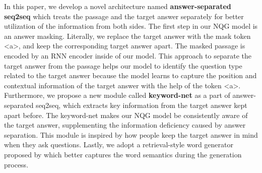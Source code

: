 \documentclass[letterpaper]{article} %
\newcommand{\kj}[1]{\textcolor{red}{#1}}
\begin{document}
In this paper, we develop a novel architecture named \textbf{answer-separated seq2seq} which treats the passage and the target answer separately for better utilization of the information from both sides. The first step in our NQG model is an answer masking. Literally, we replace the target answer with the mask token \textless a\textgreater{}, and keep the corresponding target answer apart. The masked passage is encoded by an RNN encoder inside of our model. This approach to separate the target answer from the passage helps our model to identify the question type related to the target answer because the model learns to capture the position and contextual information of the target answer with the help of the token \textless a\textgreater{}. Furthermore, we propose a new module called \textbf{keyword-net} as a part of answer-separated seq2seq, which extracts key information from the target answer kept apart before. The keyword-net makes our NQG model be consistently aware of the target answer, supplementing the information deficiency caused by answer separation. This module is inspired by how people keep the target answer in mind when they ask questions. Lastly, we adopt a retrieval-style word generator proposed by \cite{ma2018query} which better captures the word semantics during the generation process.
%
%
%
\end{document}
